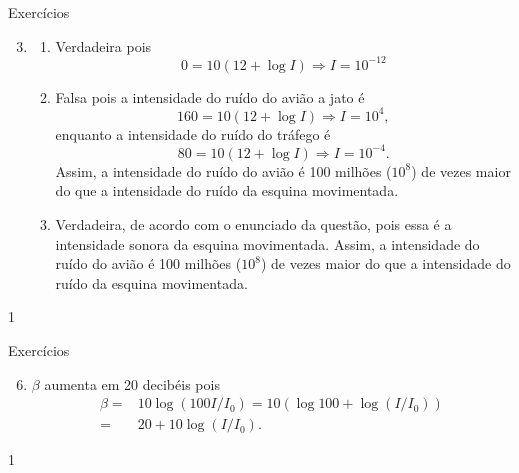 \begin{answer}{Exercícios}
{
	\exerciselist
	\begin{enumerate}\setcounter{enumi}{2}
	\Item 
	\begin{align*}
	& 80 = 120+10 \log I_1 \Rightarrow  -40 = 10\log I_1\\
	\Rightarrow & I_1 = 10^{-4},
	\end{align*}
	\begin{align*}
	& 60 = 120+10 \log I_2 \Rightarrow -60 = 10\log I_2\\
	\Rightarrow & I_2 = 10^{-6},
	\end{align*}
	Assim,
	$$
	\frac{I_1}{I_2}=\frac{10^{-4}}{10^{-6}}= 100.
	$$

	\Item
	\begin{align*}
	 20 =& N_1-N_2 = 120 +10\log I_1- (120 +10\log I_1) \\
	 =& 10\log I_1 - \log I_2 = 10\log (I_1/I_2)\\
	\Rightarrow I_1/I_2  =& 10^{2}
	\end{align*}

	\item
	\begin{enumerate}
	\item Verdadeira pois
	$$
	0 = 10(12+\log I) \Rightarrow I = 10^{-12}
	$$
	\item Falsa pois a intensidade do ruído do avião a jato é
	$$
	160 = 10(12+\log I) \Rightarrow I = 10^{4},
	$$
	enquanto a intensidade do ruído do tráfego é
	$$
	80 = 10(12+\log I) \Rightarrow I = 10^{-4}.
	$$
	Assim, a intensidade do ruído do avião é 100 milhões ($10^8$) de vezes maior do que a intensidade do ruído da esquina movimentada.
	\item Verdadeira, de acordo com o enunciado da questão, pois essa é a intensidade sonora da esquina movimentada.
	Assim, a intensidade do ruído do avião é 100 milhões ($10^8$) de vezes maior do que a intensidade do ruído da esquina movimentada.
	\end{enumerate}
	\end{enumerate}
}{1}
\end{answer}
\clearmargin
\begin{answer}{Exercícios}
{
	\exerciselist
	\begin{enumerate}\setcounter{enumi}{5}
	\item $\beta$ aumenta em 20 decibéis pois
	\begin{align*}
	\beta =& 10\log(100 I/I_0) = 10(\log 100 + \log(I/I_0))\\
	=& 20 + 10\log(I/I_0).
	\end{align*}
	\end{enumerate}
}{1}
\end{answer}
